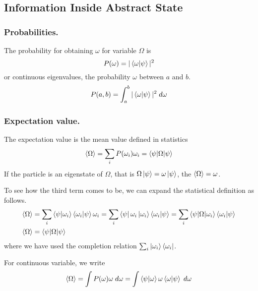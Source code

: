 \documentclass[../../../main.tex]{subfiles}
\begin{document}
\subsection{Information Inside Abstract State}
\subsubsection{Probabilities.}
The probability for obtaining $\omega$ for variable $\Omega$ is 
\begin{equation*}
    P(\omega)=|\braket{\omega|\psi}|^2
\end{equation*}
or continuous eigenvalues, the probability $\omega$ between $a$ and $b$.
\begin{equation*}
    P(a,b)=\int_{a }^{b }|\braket{\omega|\psi}|^2\;d\omega
\end{equation*}

\subsubsection{Expectation value.}
The expectation value is the mean value defined in statistics
\begin{equation*}
    \braket{\Omega}=\sum_i P(\omega_i)\omega_i=\braket{\psi|\Omega|\psi}
\end{equation*}
If the particle is an eigenstate of $\Omega$, that is $\Omega \ket{\psi}=\omega \ket{\psi}$, the $\braket{\Omega}=\omega$.

To see how the third term comes to be, we can expand the statistical definition as follows.
\begin{align*}
    \braket{\Omega }&= \sum_i \braket{\psi|\omega_i }\braket{\omega_i|\psi}\omega_i =\sum_i \bra{\psi}\omega_i \ket{\omega_i }\braket{\omega_i|\psi}=\sum_i \braket{\psi|\Omega|\omega_i}\braket{\omega_i|\psi}\\
    \braket{\Omega}&= \braket{\psi|\Omega|\psi} 
\end{align*}
where we have used the completion relation $\sum_i \ket{\omega_i}\bra{\omega_i }$.

For continuous variable, we write 
\begin{equation*}
    \braket{\Omega}=\int P(\omega)\omega\;d \omega=\int \braket{\psi|\omega}\omega \braket{\omega|\psi}\; d\omega
\end{equation*}
\end{document}
